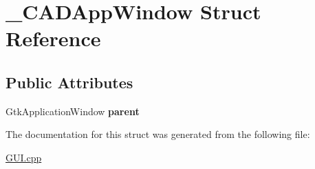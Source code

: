 \hypertarget{struct___c_a_d_app_window}{}\section{\+\_\+\+C\+A\+D\+App\+Window Struct Reference}
\label{struct___c_a_d_app_window}
\subsection*{Public Attributes}
\begin{DoxyCompactItemize}
\item 
\mbox{\label{struct___c_a_d_app_window_a1be828900029a0a3924c8ef8bd7f719b}} 
Gtk\+Application\+Window {\bfseries parent}
\end{DoxyCompactItemize}


The documentation for this struct was generated from the following file\+:\begin{DoxyCompactItemize}
\item 
\mbox{\hyperlink{_g_u_i_8cpp}{G\+U\+I.\+cpp}}\end{DoxyCompactItemize}

